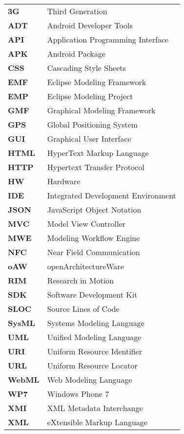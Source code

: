 \begin{tabular}{l|l}
\bfseries{3G} & Third Generation\\
\bfseries{ADT} & Android Developer Tools \\
\bfseries{API} & Application Programming Interface \\
\bfseries{APK} & Android Package \\
\bfseries{CSS} & Cascading Style Sheets\\
\bfseries{EMF} & Eclipse Modeling Framework\\
\bfseries{EMP} & Eclipse Modeling Project\\
\bfseries{GMF} & Graphical Modeling Framework\\
\bfseries{GPS} & Global Positioning System\\
\bfseries{GUI} & Graphical User Interface\\
\bfseries{HTML} & HyperText Markup Language\\
\bfseries{HTTP} & Hypertext Transfer Protocol\\
\bfseries{HW} & Hardware\\
\bfseries{IDE} & Integrated Development Environment\\
\bfseries{JSON} & JavaScript Object Notation\\
\bfseries{MVC} & Model View Controller\\
\bfseries{MWE} & Modeling Workflow Engine\\
\bfseries{NFC} & Near Field Communication\\
\bfseries{oAW} & openArchitectureWare\\
\bfseries{RIM} & Research in Motion\\
\bfseries{SDK} & Software Development Kit\\
\bfseries{SLOC} & Source Lines of Code\\
\bfseries{SysML} & Systems Modeling Language\\
\bfseries{UML} & Unified Modeling Language\\
\bfseries{URI} & Uniform Resource Identifier\\
\bfseries{URL} & Uniform Resource Locator\\
\bfseries{WebML} & Web Modeling Language\\
\bfseries{WP7} & Windows Phone 7\\
\bfseries{XMI} &  XML Metadata Interchange\\
\bfseries{XML} & eXtensible Markup Language\\
\end{tabular}

\cleardoublepage
